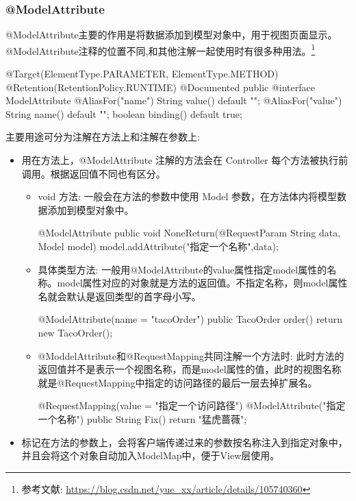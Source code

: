 \subsubsection{@ModelAttribute}

@ModelAttribute主要的作用是将数据添加到模型对象中，用于视图页面显示。@ModelAttribute注释的位置不同,和其他注解一起使用时有很多种用法。\footnote{参考文献: \url{https://blog.csdn.net/yue_xx/article/details/105740360}}

\begin{Java}
@Target({ElementType.PARAMETER, ElementType.METHOD})
@Retention(RetentionPolicy.RUNTIME)
@Documented
public @interface ModelAttribute {
    @AliasFor("name")
    String value() default "";
    @AliasFor("value")
    String name() default "";
    boolean binding() default true;
}
\end{Java}

主要用途可分为注解在方法上和注解在参数上:
\begin{itemize}
    \item 用在方法上，@ModelAttribute 注解的方法会在 Controller 每个方法被执行前调用。根据返回值不同也有区分。
    \begin{itemize}
        \item void 方法: 一般会在方法的参数中使用 Model 参数，在方法体内将模型数据添加到模型对象中。
\begin{Java}
@ModelAttribute 
public void NoneReturn(@RequestParam String data, Model model) { 
    model.addAttribute("指定一个名称",data); 
}
\end{Java}
        \item 具体类型方法: 一般用@ModelAttribute的value属性指定model属性的名称。model属性对应的对象就是方法的返回值。不指定名称，则model属性名就会默认是返回类型的首字母小写。
\begin{Java}
@ModelAttribute(name = "tacoOrder")
public TacoOrder order() {
    return new TacoOrder();
}
\end{Java}
        \item @ModdelAttribute和@RequestMapping共同注解一个方法时: 此时方法的返回值并不是表示一个视图名称，而是model属性的值，此时的视图名称就是@RequestMapping中指定的访问路径的最后一层去掉扩展名。
\begin{Java}
@RequestMapping(value = "指定一个访问路径") 
@ModelAttribute("指定一个名称") 
public String Fix() { 
    return "猛虎蔷薇"; 
} 
\end{Java}
    \end{itemize}
    \item 标记在方法的参数上，会将客户端传递过来的参数按名称注入到指定对象中，并且会将这个对象自动加入ModelMap中，便于View层使用。
\end{itemize}

